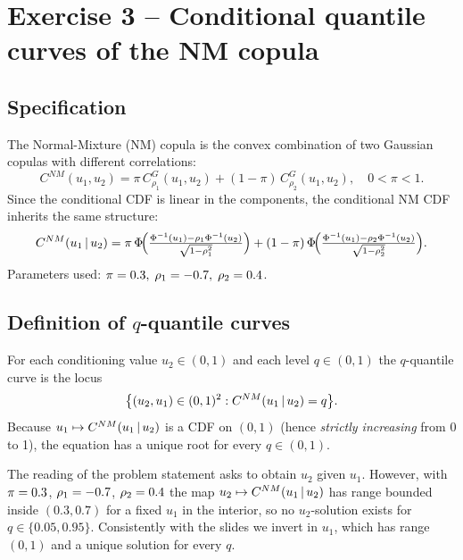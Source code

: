 \section{Exercise 3 -- Conditional quantile curves of the NM copula}\label{sec:ex3}

\subsection{Specification}

The Normal-Mixture (NM) copula is the convex combination of two Gaussian
copulas with different correlations:
\[
C^{NM}(u_1,u_2)=\pi\,C^G_{\rho_1}(u_1,u_2)+(1-\pi)\,C^G_{\rho_2}(u_1,u_2),
\quad 0<\pi<1.
\]
Since the conditional CDF is linear in the components, the conditional NM CDF
inherits the same structure:
\begin{equation}\label{eq:nm-cond}
C^{NM}(u_1\,|\, u_2)
=\pi\,\Phi\!\Bigl(\tfrac{\Phi^{-1}(u_1)-\rho_1\Phi^{-1}(u_2)}{\sqrt{1-\rho_1^2}}\Bigr)
+(1-\pi)\,\Phi\!\Bigl(\tfrac{\Phi^{-1}(u_1)-\rho_2\Phi^{-1}(u_2)}{\sqrt{1-\rho_2^2}}\Bigr).
\end{equation}
Parameters used: $\pi=0.3,\;\rho_1=-0.7,\;\rho_2=0.4$.

\subsection{Definition of $q$-quantile curves}

For each conditioning value $u_2\in(0,1)$ and each level $q\in(0,1)$ the
$q$-quantile curve is the locus
\[
\bigl\{(u_2,u_1)\in(0,1)^2 : C^{NM}(u_1\,|\, u_2)=q\bigr\}.
\]
Because $u_1\mapsto C^{NM}(u_1\,|\, u_2)$ is a CDF on $(0,1)$ (hence
\emph{strictly increasing} from 0 to 1), the equation has a unique root for
every $q\in(0,1)$. 

\begin{remark}
The reading of the problem statement asks to obtain $u_2$
given $u_1$. However, with $\pi=0.3$, $\rho_1=-0.7$, $\rho_2=0.4$ the map
$u_2\mapsto C^{NM}(u_1\,|\, u_2)$ has range bounded inside $(0.3,0.7)$ for a
fixed $u_1$ in the interior, so no $u_2$-solution exists for $q\in\{0.05,0.95\}$.
Consistently with the slides we invert in $u_1$, which has range $(0,1)$ and a unique
solution for every $q$.
\end{remark}

